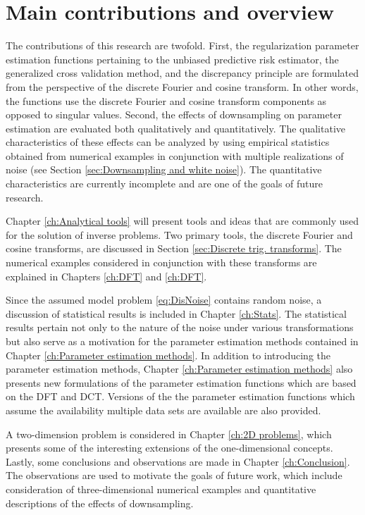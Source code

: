 \documentclass[12pt,notitlepage]{report}
\begin{document}
\section{Main contributions and overview}
The contributions of this research are twofold. First, the regularization parameter estimation functions pertaining to the unbiased predictive risk estimator, the generalized cross validation method, and the discrepancy principle are formulated from the perspective of the discrete Fourier and cosine transform. In other words, the functions use the discrete Fourier and cosine transform components as opposed to singular values. Second, the effects of downsampling on parameter estimation are evaluated both qualitatively and quantitatively. The qualitative characteristics of these effects can be analyzed by using empirical statistics obtained from numerical examples in conjunction with multiple realizations of noise (see Section \ref{sec:Downsampling and white noise}). The quantitative characteristics are currently incomplete and are one of the goals of future research. \par
Chapter \ref{ch:Analytical tools} will present tools and ideas that are commonly used for the solution of inverse problems. Two primary tools, the discrete  Fourier and cosine transforms, are discussed in Section \ref{sec:Discrete trig. transforms}. The numerical examples considered in conjunction with these transforms are explained in Chapters \ref{ch:DFT} and \ref{ch:DFT}. \par 
Since the assumed model problem \eqref{eq:DisNoise} contains random noise, a discussion of statistical results is included in Chapter \ref{ch:Stats}. The statistical results pertain not only to the nature of the noise under various transformations but also serve as a motivation for the parameter estimation methods contained in Chapter \ref{ch:Parameter estimation methods}. In addition to introducing the parameter estimation methods, Chapter \ref{ch:Parameter estimation methods} also presents new formulations of the parameter estimation functions which are based on the DFT and DCT. Versions of the the parameter estimation functions which assume the availability multiple data sets are available are also provided.  \par  
A two-dimension problem is considered in Chapter \ref{ch:2D problems}, which presents some of the interesting extensions of the one-dimensional concepts. Lastly, some conclusions and observations are made in Chapter \ref{ch:Conclusion}. The observations are used to motivate the goals of future work, which include consideration of three-dimensional numerical examples and quantitative descriptions of the effects of downsampling.
\end{document}
